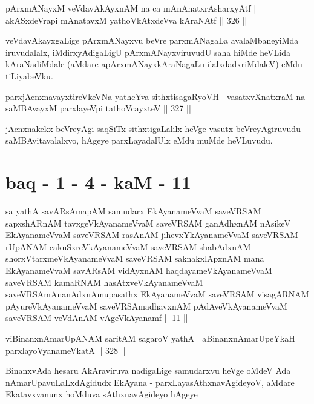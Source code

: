 \begin{shl}
pArxmANayxM veVdavAkAyxnAM na ca mAnAnatxrAsharxyAtf |
akASxdeVrapi mAnatavxM yathoVkAtxdeVva kAraNAtf \hfill || 326 ||
\end{shl}

\begin{artha}
veVdavAkayxgaLige pArxmANayxvu beVre parxmANagaLa avalaMbaneyiMda iruvu\-dalalx, iMdirxyAdigaLigU pArxmANayxviruvudU saha hiMde heVLida kAraNadiMdale (aMdare apArxmANayxkAraNagaLu ilalxdadxriMdaleV) eMdu tiLiyabeVku.
\end{artha}


\begin{shl}
parxjAcnxnavayxtireVkeVNa yatheYva sithxtisagaRyoVH |
vasatxvXnatxraM na saMBAvayxM parxlayeV\s pi tathoVcayxteV \hfill || 327 ||
\end{shl}

\begin{artha}
jAcnxnakekx beVreyAgi saqSiTx sithxtigaLalilx heVge vasutx beVreyAgiruvudu saMBAvitavalalxvo, hAgeye parxLayadalUlx eMdu muMde heVLuvudu.
\end{artha}

\section*{baq - 1 - 4 - kaM - 11}

\begin{shl}
sa yathA savARsAmapAM samudarx EkAyanameVvaM saveVRSAM sapxshARnAM tavxgeVkAyanameVvaM saveVRSAM ganAdhxnAM nAsikeV EkAyanameVvaM saveVRSAM rasAnAM jihevxYkAyanameVvaM saveVRSAM rUpANAM cakuSxreVkAyanameVvaM saveVRSAM shabAdxnAM shorxVtarxmeVkAyanameVvaM saveVRSAM saknakxlApxnAM mana EkAyanameVvaM savARsAM vidAyxnAM haqdayameVkAyanameVvaM saveVRSAM kamaRNAM hasAtxveVkAyanameVvaM saveVRSAmAnanAdxnAmupasathx EkAyanameVvaM saveVRSAM visagARNAM pAyureVkAyanameVvaM saveVRSAmadhavxnAM pAdAveVkAyanameVvaM saveVRSAM veVdAnAM vAgeVkAyanamf || 11 || 
\end{shl}

\begin{shl}
viBinanxnAmarUpANAM saritAM sagaroV yathA |
aBinanxnAmarUpeYkaH parxlayoV\s yanameVkatA \hfill || 328 ||
\end{shl}

\begin{artha}
BinanxvAda hesaru AkAraviruva nadigaLige samudarxvu heVge oMdeV Ada nAma\-rUpavuLaLxdAgidudx EkAyana - parxLayasAthxnavAgideyoV, aMdare Ekatavxvanunx hoMduva sAthxnavAgideyo hAgeye
\end{artha}

